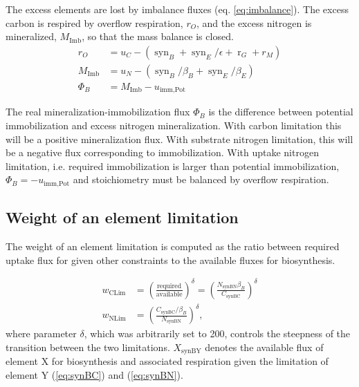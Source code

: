 The excess elements are lost by imbalance fluxes (eq. \ref{eq:imbalance}).
The excess carbon is respired by overflow respiration, $r_O$, and the excess
nitrogen is mineralized, $M_{\operatorname{Imb}}$, so that the mass
balance is closed.
\begin{subequations}
\label{eq:imbalance}
\begin{align}
r_O &= u_C - (\operatorname{syn}_B + \operatorname{syn}_E /\epsilon  + 
\operatorname{r}_G + r_M )\\
M_{\operatorname{Imb}} &= u_N -
(\operatorname{syn}_{B}/\beta_B + \operatorname{syn}_E/\beta_E )
\\
\label{eq:PhiB}
\Phi_B &= M_{\operatorname{Imb}} - u_{\operatorname{imm,Pot}}  
\end{align} 
\end{subequations}

The real mineralization-immobilization flux $\Phi_B$ is the difference between
potential immobilization and excess nitrogen mineralization.
With carbon limitation this will be a positive mineralization flux. With
substrate nitrogen limitation, this will be a negative flux corresponding to
immobilization.
With uptake nitrogen limitation, i.e. required immobilization is larger than
potential immobilization, $\Phi_B = -u_{\operatorname{imm,Pot}}$ and
stoichiometry must be balanced by overflow respiration.

\subsection{Weight of an element limitation}

The weight of an element limitation is computed as the ratio between required
uptake flux for given other constraints to the available fluxes for
biosynthesis.
  
\begin{subequations}
\label{eq:weightsLim}
\begin{align}
w_{\operatorname{CLim}} &= \left( \frac{\text{required}}{\text{available}}
\right)^\delta 
= \left( \frac{ N_{\operatorname{synBN}} \beta_B }{ C_{\operatorname{synBC}} }
\right)^\delta
\\
w_{\operatorname{NLim}} &= \left( \frac{ C_{\operatorname{synBC}} / \beta_B }{
N_{\operatorname{synBN}} } \right)^\delta
\text{,} 
\end{align}
\end{subequations}
where parameter $\delta$, which was arbitrarily set to 200, controls
the steepness of the transition between the two limitations.
$X_{\operatorname{synBY}}$ denotes the available flux of element X for
biosynthesis and associated respiration given the limitation of element Y
(\ref{eq:synBC}) and (\ref{eq:synBN}).



